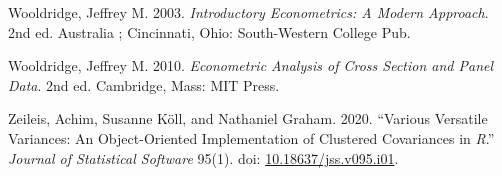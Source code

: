 \documentclass [11pt, proquest] {uwthesis}[2015/03/03]
\newlength{\cslhangindent}
\newenvironment{CSLReferences}[2]%
{\setlength{\parindent}{0pt}%
\everypar{\setlength{\hangindent}{\cslhangindent}}\ignorespaces}%
{\par}
\begin{document}
\begin{CSLReferences}{1}{0}
\leavevmode\hypertarget{ref-wooldridgeIntroductoryEconometricsModern2003}{}%
Wooldridge, Jeffrey M. 2003. \emph{Introductory Econometrics: A Modern Approach}. 2nd ed. {Australia ; Cincinnati, Ohio}: {South-Western College Pub}.

\leavevmode\hypertarget{ref-wooldridgeEconometricAnalysisCross2010}{}%
Wooldridge, Jeffrey M. 2010. \emph{Econometric {Analysis} of {Cross Section} and {Panel Data}}. 2nd ed. {Cambridge, Mass}: {MIT Press}.

\leavevmode\hypertarget{ref-zeileisVariousVersatileVariances2020}{}%
Zeileis, Achim, Susanne Köll, and Nathaniel Graham. 2020. {``Various {Versatile Variances}: {An Object}-{Oriented Implementation} of {Clustered Covariances} in {\emph{R}}.''} \emph{Journal of Statistical Software} 95(1). doi: \href{https://doi.org/10.18637/jss.v095.i01}{10.18637/jss.v095.i01}.

\end{CSLReferences}
\end{document}
